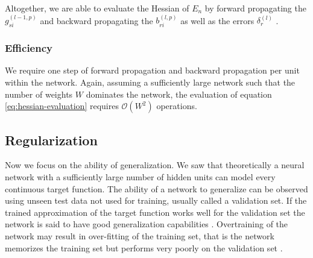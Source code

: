 Altogether, we are able to evaluate the Hessian of $E_n$ by forward propagating the $g_{si}^{(l-1,p)}$ and backward propagating the $b_{ri}^{(l,p)}$ as well as the errors $\delta_r^{(l)}$ \cite{Bishop:1992}.

%

\subsubsection{Efficiency}

We require one step of forward propagation and backward propagation per unit within the network. Again, assuming a sufficiently large network such that the number of weights $W$ dominates the network, the evaluation of equation \eqref{eq:hessian-evaluation} requires $\mathcal{O}(W^2)$ operations.

\subsection{Regularization}

Now we focus on the ability of generalization. We saw that theoretically a neural network with a sufficiently large number of hidden units can model every continuous target function. The ability of a network to generalize can be observed using unseen test data not used for training, usually called a validation set. If the trained approximation of the target function works well for the validation set the network is said to have good generalization capabilities \cite[p.~227-228]{Haykin:2005}. Overtraining of the network may result in over-fitting of the training set, that is the network memorizes the training set but performs very poorly on the validation set \cite[p.~227-228]{Haykin:2005}.

